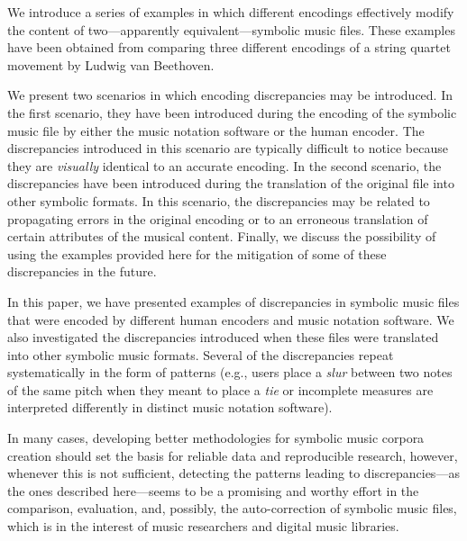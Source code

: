 
We introduce a series of examples in which different encodings effectively modify the content of two---apparently equivalent---symbolic music files. These examples have been obtained from comparing three different encodings of a string quartet movement by Ludwig van Beethoven.

We present two scenarios in which encoding discrepancies may be introduced. In the first scenario, they have been introduced during the encoding of the symbolic music file by either the music notation software or the human encoder. The discrepancies introduced in this scenario are typically difficult to notice because they are \emph{visually} identical to an accurate encoding. In the second scenario, the discrepancies have been introduced during the translation of the original file into other symbolic formats. In this scenario, the discrepancies may be related to propagating errors in the original encoding or to an erroneous translation of certain attributes of the musical content. Finally, we discuss the possibility of using the examples provided here for the mitigation of some of these discrepancies in the future.


In this paper, we have presented examples of discrepancies in symbolic music files that were encoded by different human encoders and music notation software. We also investigated the discrepancies introduced when these files were translated into other symbolic music formats. Several of the discrepancies repeat systematically in the form of patterns (e.g., users place a \emph{slur} between two notes of the same pitch when they meant to place a \emph{tie} or incomplete measures are interpreted differently in distinct music notation software).

In many cases, developing better methodologies for symbolic music corpora creation \parencite{mckay2018} should set the basis for reliable data and reproducible research, however, whenever this is not sufficient, detecting the patterns leading to discrepancies---as the ones described here---seems to be a promising and worthy effort in the comparison, evaluation, and, possibly, the auto-correction of symbolic music files, which is in the interest of music researchers and digital music libraries.
